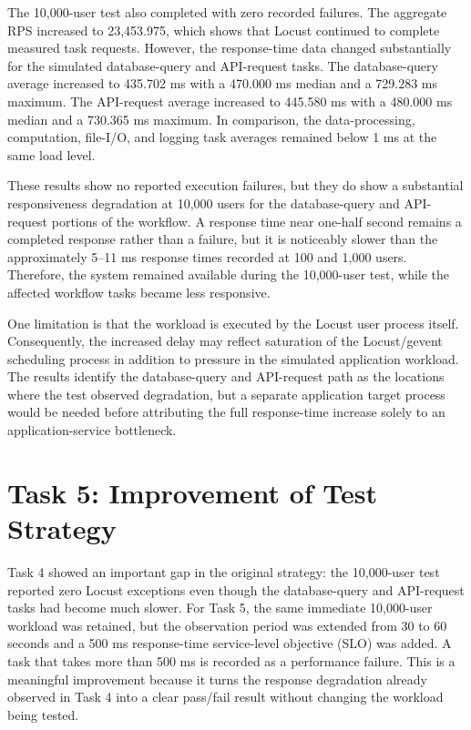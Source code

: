 \documentclass[11pt]{article}
\begin{document}
The 10,000-user test also completed with zero recorded failures. The aggregate RPS increased to 23,453.975, which shows that Locust continued to complete measured task requests. However, the response-time data changed substantially for the simulated database-query and API-request tasks. The database-query average increased to 435.702 ms with a 470.000 ms median and a 729.283 ms maximum. The API-request average increased to 445.580 ms with a 480.000 ms median and a 730.365 ms maximum. In comparison, the data-processing, computation, file-I/O, and logging task averages remained below 1 ms at the same load level.

These results show no reported execution failures, but they do show a substantial responsiveness degradation at 10,000 users for the database-query and API-request portions of the workflow. A response time near one-half second remains a completed response rather than a failure, but it is noticeably slower than the approximately 5--11 ms response times recorded at 100 and 1,000 users. Therefore, the system remained available during the 10,000-user test, while the affected workflow tasks became less responsive.

One limitation is that the workload is executed by the Locust user process itself. Consequently, the increased delay may reflect saturation of the Locust/gevent scheduling process in addition to pressure in the simulated application workload. The results identify the database-query and API-request path as the locations where the test observed degradation, but a separate application target process would be needed before attributing the full response-time increase solely to an application-service bottleneck.

\section{Task 5: Improvement of Test Strategy}

Task 4 showed an important gap in the original strategy: the 10,000-user test reported zero Locust exceptions even though the database-query and API-request tasks had become much slower. For Task 5, the same immediate 10,000-user workload was retained, but the observation period was extended from 30 to 60 seconds and a 500 ms response-time service-level objective (SLO) was added. A task that takes more than 500 ms is recorded as a performance failure. This is a meaningful improvement because it turns the response degradation already observed in Task 4 into a clear pass/fail result without changing the workload being tested.
\end{document}
